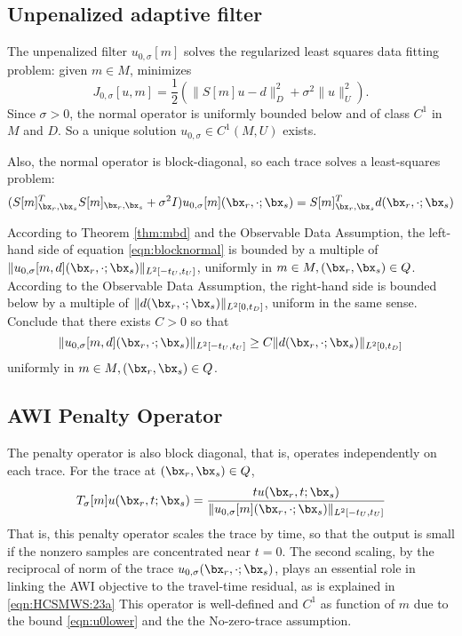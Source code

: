\subsection{ Unpenalized adaptive filter}
The unpenalized filter $u_{0,\sigma}[m]$ solves the regularized least squares data fitting problem:  given $m \in M$, minimizes
\[
 J_{0,\sigma}[u,m] = \frac{1}{2}(\|S[m]u - d\|_D^2 + \sigma^2 \|u\|^2_U).
\]
Since $\sigma > 0$, the normal operator is uniformly bounded below and of class $C^1$ in $M$ and $D$. So a unique solution $u_{0,\sigma} \in C^1(M, U)$ exists.

Also, the normal operator is block-diagonal, so each trace solves a least-squares problem:
\begin{equation}
  \label{eqn:blocknormal}
  (S[m]_{\bx_r,\bx_s}^TS[m]_{\bx_r,\bx_s} + \sigma^2 I)u_{0,\sigma}[m](\bx_r,\cdot; \bx_s)= S[m]_{\bx_r,\bx_s}^Td(\bx_r,\cdot;\bx_s)
\end{equation}

According to Theorem \ref{thm:mbd} and the Observable Data Assumption, the left-hand side of equation \ref{eqn:blocknormal} is bounded by a multiple of $\|u_{0,\sigma}[m,d](\bx_r,\cdot; \bx_s)\|_{L^2[-t_U,t_U]}$, uniformly in $m \in M, (\bx_r,\bx_s) \in Q$. According to the Observable Data Assumption, the right-hand side is bounded below by a multiple of $\|d(\bx_r,\cdot;\bx_s)\|_{L^2[0,t_D]}$, uniform in the same sense. Conclude that there exists $C>0$ so that
\begin{equation}
  \label{eqn:u0lower}
  \|u_{0,\sigma}[m,d](\bx_r,\cdot; \bx_s)\|_{L^2[-t_U,t_U]} \ge C \|d(\bx_r,\cdot;\bx_s)\|_{L^2[0,t_D]}
\end{equation}
uniformly in $m \in M, (\bx_r,\bx_s) \in Q$.

\subsection{AWI Penalty Operator}
The penalty operator is also block diagonal, that is, operates independently on each trace. For the trace at $(\bx_r,\bx_s) \in Q$, 
\begin{equation}
  \label{eqn:ppf}
  T_{\sigma}[m]u (\bx_r,t;\bx_s) = \frac{t u(\bx_r,t;\bx_s)}{\|u_{0,\sigma}[m](\bx_r,\cdot; \bx_s)\|_{L^2[-t_U,t_U]} }
\end{equation}
That is, this penalty operator scales the trace by time, so that the output is small if the nonzero samples are concentrated near $t=0$. The second scaling, by the reciprocal of norm of the trace $u_{0,\sigma}(\bx_r,\cdot;\bx_s)$, plays an essential role in linking the AWI objective to the travel-time residual, as is explained in \ref{eqn:HCSMWS:23a}
This operator is well-defined and $C^1$ as function of $m$ due to the bound \ref{eqn:u0lower} and the the No-zero-trace assumption.

